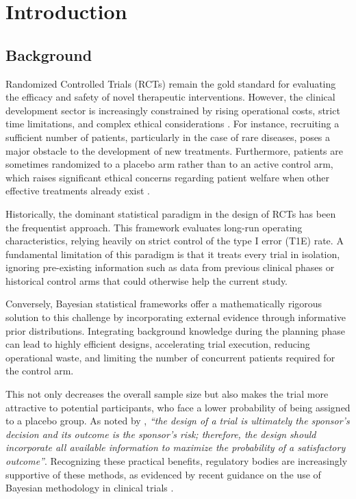 \chapter{Introduction}

\section{Background}

Randomized Controlled Trials (RCTs) remain the gold standard for evaluating the efficacy and safety of novel therapeutic interventions. 
However, the clinical development sector is increasingly constrained by rising operational costs, strict time limitations, and complex 
ethical considerations \citep{dimasi_innovation_2016}. For instance, recruiting a sufficient number of patients, particularly in the case of 
rare diseases, poses a major obstacle to the development of new treatments. Furthermore, patients are sometimes randomized to a placebo arm rather than to an 
active control arm, which raises significant ethical concerns regarding patient welfare when other effective treatments already exist \citep{freedman_scientific_1987, world_medical_association_world_2025}.

Historically, the dominant statistical paradigm in the design of RCTs has been the frequentist approach. This framework evaluates long-run operating 
characteristics, relying heavily on strict control of the type I error (T1E) rate. A fundamental limitation of this paradigm is that it treats every trial 
in isolation, ignoring pre-existing information such as data from previous clinical phases or historical control arms that could otherwise 
help the current study. 

Conversely, Bayesian statistical frameworks offer a mathematically rigorous solution to this challenge by incorporating external evidence 
through informative prior distributions. Integrating background knowledge during the planning phase can lead to highly efficient designs, 
accelerating trial execution, reducing operational waste, and limiting the number of concurrent patients required for the control arm.

This not only decreases the overall sample size but also makes the trial more attractive to potential participants, who face a lower 
probability of being assigned to a placebo group. As noted by \citet{ohagan_assurance_2005}, \textit{``the design of a trial 
is ultimately the sponsor's decision and its outcome is the sponsor's risk; therefore, the design should incorporate all available information to 
maximize the probability of a satisfactory outcome''}.
Recognizing these practical benefits, regulatory bodies are increasingly supportive of these methods, as 
evidenced by recent guidance on the use of Bayesian methodology in clinical trials \citep{fda_bayesian_2026}.

